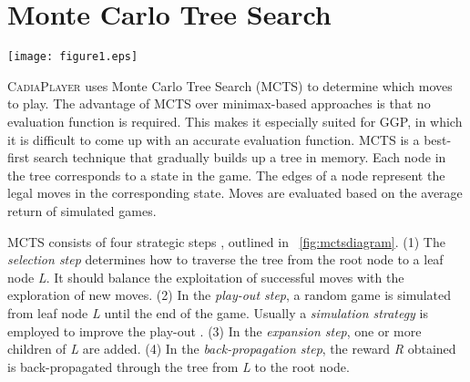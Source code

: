 \documentclass[journal]{IEEEtran}
\begin{document}
\section{Monte Carlo Tree Search}
\label{sec:mcts}
\begin{figure*}[t!]
\centering

\texttt{[image: figure1.eps]}

\caption{Four strategic steps in Monte Carlo Tree Search}
\label{fig:mctsdiagram}
\end{figure*}


\textsc{CadiaPlayer} \cite{BjornssonF09,finnsonphdthesis} uses Monte Carlo Tree Search (MCTS) \cite{mctsBandit,mctsSelectivity} to determine which moves to play. The advantage of MCTS over minimax-based approaches is that no evaluation function is required. This makes it especially suited for GGP, in which it is difficult to come up with an accurate evaluation function.
MCTS is a best-first search technique that gradually builds up a tree in memory. Each node in the tree corresponds to a state in the game. The edges of a node represent the legal moves in the corresponding state. Moves are evaluated based on the average return of simulated games.

MCTS consists of four strategic steps \cite{mcts}, outlined in \figurename~\ref{fig:mctsdiagram}. (1) The \textit{selection step} determines how to traverse the tree from the root node to a leaf node \textit{L}. It should balance the exploitation of successful moves with the exploration of new moves. (2) In the \textit{play-out step}, a random game is simulated from leaf node \textit{L} until the end of the game.  Usually a \textit{simulation strategy} is employed to improve the play-out \cite{Gelly:2007}. (3) In the \textit{expansion step}, one or more children of \textit{L} are added. (4) In the \textit{back-propagation step}, the reward \textit{R} obtained is back-propagated through the tree from \textit{L} to the root node.
\end{document}
